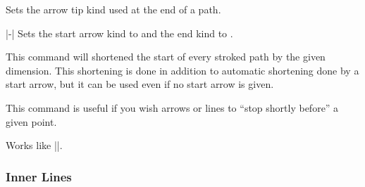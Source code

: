 \begin{command}{\pgfsetarrowsend{}}
  Sets the arrow tip kind used at the end of a path.
\begin{codeexample}[]
\begin{pgfpicture}
  \pgfpathmoveto{\pgfpointorigin}
  \pgfpathlineto{\pgfpoint{1cm}{0cm}}
\end{pgfpicture}
\end{codeexample}
\end{command}

\begin{command}{|-|}
  Sets the start arrow kind to  and the end kind to
  .
\begin{codeexample}[]
\begin{pgfpicture}
  \pgfpathmoveto{\pgfpointorigin}
  \pgfpathlineto{\pgfpoint{1cm}{0cm}}
\end{pgfpicture}
\end{codeexample}
\end{command}

\begin{command}{\pgfsetshortenstart{}}
  This command will shortened the start of every stroked path by the
  given dimension. This shortening is done in addition to automatic
  shortening done by a start arrow, but it can be used even if no
  start arrow is given.

  This command is useful if you wish arrows or lines to ``stop shortly
  before'' a given point.
\begin{codeexample}[]
\begin{pgfpicture}
  \pgfpathcircle{\pgfpointorigin}{5mm}
  \pgfsetshortenstart{4pt}
  \pgfpathmoveto{\pgfpoint{5mm}{0cm}} %
  \pgfpathlineto{\pgfpoint{2cm}{0cm}}
\end{pgfpicture}
\end{codeexample}
\end{command}
  
\begin{command}{\pgfsetshortenend{}}
  Works like |\pgfsetshortenstart|.
\end{command}


\subsubsection{Inner Lines}

